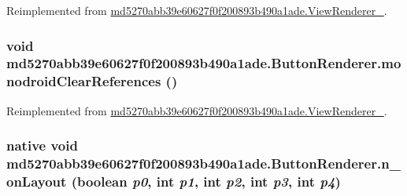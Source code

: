 Reimplemented from \hyperlink{classmd5270abb39e60627f0f200893b490a1ade_1_1_view_renderer__2_04a86dd6eb699648d23fe42d567c6962}{md5270abb39e60627f0f200893b490a1ade.ViewRenderer\_}.\hypertarget{classmd5270abb39e60627f0f200893b490a1ade_1_1_button_renderer_85b560fcbb7fbef8f3ec48b9bf724210}{
\subsubsection[{monodroidClearReferences}]{\setlength{\rightskip}{0pt plus 5cm}void md5270abb39e60627f0f200893b490a1ade.ButtonRenderer.monodroidClearReferences ()}}
\label{classmd5270abb39e60627f0f200893b490a1ade_1_1_button_renderer_85b560fcbb7fbef8f3ec48b9bf724210}




Reimplemented from \hyperlink{classmd5270abb39e60627f0f200893b490a1ade_1_1_view_renderer__2_4832372c2c5755cd4e9f279f9b051454}{md5270abb39e60627f0f200893b490a1ade.ViewRenderer\_}.\hypertarget{classmd5270abb39e60627f0f200893b490a1ade_1_1_button_renderer_fd8f463e834eac0c0aa3ec80c6a310bc}{
\subsubsection[{n\_\-onLayout}]{\setlength{\rightskip}{0pt plus 5cm}native void md5270abb39e60627f0f200893b490a1ade.ButtonRenderer.n\_\-onLayout (boolean {\em p0}, \/  int {\em p1}, \/  int {\em p2}, \/  int {\em p3}, \/  int {\em p4})}}
\label{classmd5270abb39e60627f0f200893b490a1ade_1_1_button_renderer_fd8f463e834eac0c0aa3ec80c6a310bc}




